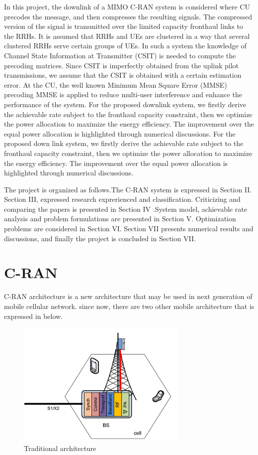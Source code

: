 \documentclass[journal,onecolumn,11pt,draftcls,doublespace]{IEEEtran}
\begin{document}
In this project, the downlink of a MIMO C-RAN system is considered where CU precodes the message, and then compresses the resulting signals. The compressed version of the signal is transmitted over the limited capacity fronthaul links to the RRHs. It is assumed that RRHs and UEs are clustered in a way that several clustered RRHs serve certain groups of UEs. In such a system the knowledge of Channel State Information at Transmitter (CSIT) is needed to compute the precoding matrices. Since CSIT is imperfectly obtained from the uplink pilot transmissions, we assume that the CSIT is obtained with a certain estimation error. At the CU, the well known Minimum Mean Square Error (MMSE) precoding MMSE is applied to reduce multi-user interference and enhance the performance of the system. For the proposed downlink system, we firstly derive the achievable rate subject to the fronthaul capacity constraint, then we optimize the power allocation to maximize the energy efficiency. The improvement over the equal power allocation is highlighted through numerical discussions. For the proposed down link system, we firstly derive the achievable rate subject to the fronthaul capacity constraint, then we optimize the power allocation to maximize the energy efficiency. The improvement over the equal power allocation is highlighted through numerical discussions.

The project is organized as follows.The C-RAN system is expressed in Section II. Section III, expressed  research exprerienced and classification. Criticizing and comparing the papers is presented in Section IV .System model, achievable rate analysis and problem formulations are presented in Section V. Optimization problems are considered in Section VI. Section VII presents numerical results and discussions, and finally the project is concluded in Section VII.
\section{C-RAN}
C-RAN architecture is a new architecture that may be used in next generation of mobile cellular network.
since now, there are two other mobile architecture that is expressed in below.
  \begin{figure}
  \centering
    \includegraphics[width=0.5\linewidth, height=6cm]{trad}
  \caption{Traditional architecture \cite{369}}
  \label{fig:trad}
\end{figure}
\end{document}
